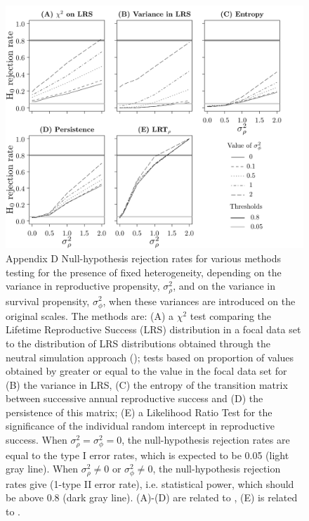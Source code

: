 \begin{figure}[H]
		\includegraphics[width=\textwidth]{FiguresDynHet/Figure6}
	\caption{Appendix D \footnotesize Null-hypothesis rejection rates for various methods testing for the presence of fixed heterogeneity, depending on the variance in reproductive propensity, $\sigma_{\rho}^2$, and on the variance in survival propensity, $\sigma_{\phi}^2$, when these variances are introduced on the original scales. The methods are: (A) a $\chi^2$ test comparing the Lifetime Reproductive Success (LRS) distribution in a focal data set to the distribution of LRS distributions obtained through the neutral simulation approach (\NSM); tests based on proportion of values obtained by \NSM greater or equal to the value in the focal data set for (B) the variance in LRS, (C) the entropy of the transition matrix between successive annual reproductive success and (D) the persistence of this matrix; (E) a Likelihood Ratio Test for the significance of the individual random intercept in reproductive success. When $\sigma_{\rho}^2 = \sigma_{\phi}^2 = 0$, the null-hypothesis rejection rates are equal to the type I error rates, which is expected to be 0.05 (light gray line). When $\sigma_{\rho}^2 \neq 0$ or $\sigma_{\phi}^2 \neq 0$, the null-hypothesis rejection rates give (1-type II error rate), i.e. statistical power, which should be above 0.8 (dark gray line). (A)-(D) are related to \NSM, (E) is related to \MM.}	
	\label{figure:VarOut}
\end{figure}

